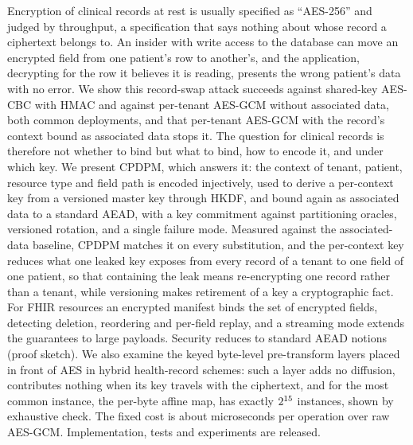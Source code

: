 Encryption of clinical records at rest is usually specified as ``AES-256'' and judged by throughput, a specification that says nothing about whose record a ciphertext belongs to. An insider with write access to the database can move an encrypted field from one patient's row to another's, and the application, decrypting for the row it believes it is reading, presents the wrong patient's data with no error. We show this record-swap attack succeeds against shared-key AES-CBC with HMAC and against per-tenant AES-GCM without associated data, both common deployments, and that per-tenant AES-GCM with the record's context bound as associated data stops it. The question for clinical records is therefore not whether to bind but what to bind, how to encode it, and under which key. We present CPDPM, which answers it: the context of tenant, patient, resource type and field path is encoded injectively, used to derive a per-context key from a versioned master key through HKDF, and bound again as associated data to a standard AEAD, with a key commitment against partitioning oracles, versioned rotation, and a single failure mode. Measured against the associated-data baseline, CPDPM matches it on every substitution, and the per-context key reduces what one leaked key exposes from every record of a tenant to one field of one patient, so that containing the leak means re-encrypting one record rather than a tenant, while versioning makes retirement of a key a cryptographic fact. For FHIR resources an encrypted manifest binds the set of encrypted fields, detecting deletion, reordering and per-field replay, and a streaming mode extends the guarantees to large payloads. Security reduces to standard AEAD notions (proof sketch). We also examine the keyed byte-level pre-transform layers placed in front of AES in hybrid health-record schemes: such a layer adds no diffusion, contributes nothing when its key travels with the ciphertext, and for the most common instance, the per-byte affine map, has exactly $2^{15}$ instances, shown by exhaustive check. The fixed cost is about \CpdpmFixedUs{} microseconds per operation over raw AES-GCM. Implementation, tests and experiments are released.
